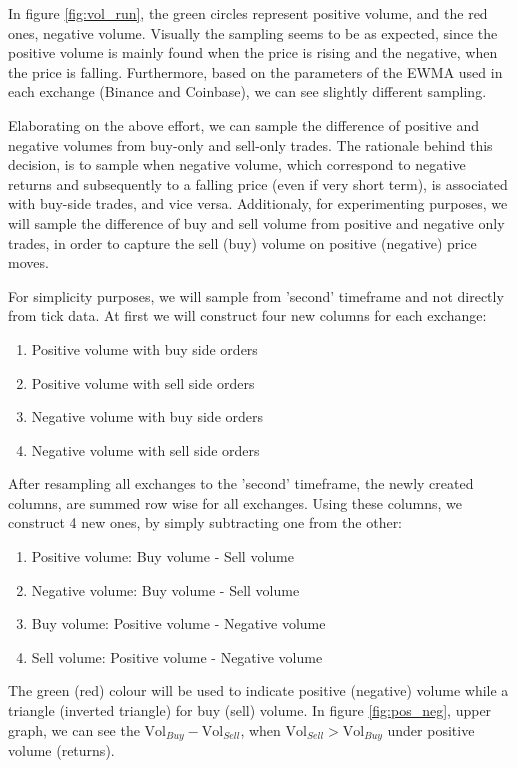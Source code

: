 In figure \ref{fig:vol_run}, the green circles represent positive volume, and the red ones, negative volume. Visually the sampling seems to be as expected, since the positive volume is mainly found when the price is rising and the negative, when the price is falling. Furthermore, based on the parameters of the EWMA used in each exchange (Binance and Coinbase), we can see slightly different sampling.

Elaborating on the above effort, we can sample the difference of positive and negative volumes from buy-only and sell-only trades. The rationale behind this decision, is to sample when negative volume, which correspond to negative returns and subsequently to a falling price (even if very short term), is associated with buy-side trades, and vice versa. Additionaly, for experimenting purposes, we will sample the difference of buy and sell volume from positive and negative only trades, in order to capture the sell (buy) volume on positive (negative) price moves.

For simplicity purposes, we will sample from 'second' timeframe and not directly from tick data. At first we will construct four new columns for each exchange:

\begin{enumerate}
\item Positive volume with buy side orders
\item Positive volume with sell side orders
\item Negative volume with buy side orders
\item Negative volume with sell side orders
\end{enumerate}

After resampling all exchanges to the 'second' timeframe, the newly created columns, are summed row wise for all exchanges. Using these columns, we construct 4 new ones, by simply subtracting one from the other:

\begin{enumerate}
\item Positive volume: Buy volume - Sell volume
\item Negative volume: Buy volume - Sell volume
\item Buy volume: Positive volume - Negative volume
\item Sell volume: Positive volume - Negative volume
\end{enumerate}

The green (red) colour will be used to indicate positive (negative) volume while a triangle (inverted triangle) for buy (sell) volume. In figure \ref{fig:pos_neg}, upper graph, we can see the \(\text{Vol}_{Buy} - \text{Vol}_{Sell} \), when \(\text{Vol}_{Sell} > \text{Vol}_{Buy} \) under positive volume (returns). 
 
